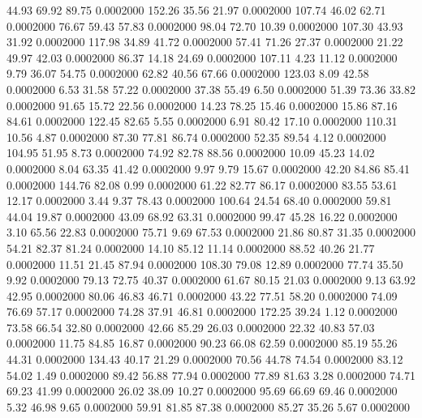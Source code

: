   44.93   69.92   89.75   0.0002000
 152.26   35.56   21.97   0.0002000
 107.74   46.02   62.71   0.0002000
  76.67   59.43   57.83   0.0002000
  98.04   72.70   10.39   0.0002000
 107.30   43.93   31.92   0.0002000
 117.98   34.89   41.72   0.0002000
  57.41   71.26   27.37   0.0002000
  21.22   49.97   42.03   0.0002000
  86.37   14.18   24.69   0.0002000
 107.11    4.23   11.12   0.0002000
   9.79   36.07   54.75   0.0002000
  62.82   40.56   67.66   0.0002000
 123.03    8.09   42.58   0.0002000
   6.53   31.58   57.22   0.0002000
  37.38   55.49    6.50   0.0002000
  51.39   73.36   33.82   0.0002000
  91.65   15.72   22.56   0.0002000
  14.23   78.25   15.46   0.0002000
  15.86   87.16   84.61   0.0002000
 122.45   82.65    5.55   0.0002000
   6.91   80.42   17.10   0.0002000
 110.31   10.56    4.87   0.0002000
  87.30   77.81   86.74   0.0002000
  52.35   89.54    4.12   0.0002000
 104.95   51.95    8.73   0.0002000
  74.92   82.78   88.56   0.0002000
  10.09   45.23   14.02   0.0002000
   8.04   63.35   41.42   0.0002000
   9.97    9.79   15.67   0.0002000
  42.20   84.86   85.41   0.0002000
 144.76   82.08    0.99   0.0002000
  61.22   82.77   86.17   0.0002000
  83.55   53.61   12.17   0.0002000
   3.44    9.37   78.43   0.0002000
 100.64   24.54   68.40   0.0002000
  59.81   44.04   19.87   0.0002000
  43.09   68.92   63.31   0.0002000
  99.47   45.28   16.22   0.0002000
   3.10   65.56   22.83   0.0002000
  75.71    9.69   67.53   0.0002000
  21.86   80.87   31.35   0.0002000
  54.21   82.37   81.24   0.0002000
  14.10   85.12   11.14   0.0002000
  88.52   40.26   21.77   0.0002000
  11.51   21.45   87.94   0.0002000
 108.30   79.08   12.89   0.0002000
  77.74   35.50    9.92   0.0002000
  79.13   72.75   40.37   0.0002000
  61.67   80.15   21.03   0.0002000
   9.13   63.92   42.95   0.0002000
  80.06   46.83   46.71   0.0002000
  43.22   77.51   58.20   0.0002000
  74.09   76.69   57.17   0.0002000
  74.28   37.91   46.81   0.0002000
 172.25   39.24    1.12   0.0002000
  73.58   66.54   32.80   0.0002000
  42.66   85.29   26.03   0.0002000
  22.32   40.83   57.03   0.0002000
  11.75   84.85   16.87   0.0002000
  90.23   66.08   62.59   0.0002000
  85.19   55.26   44.31   0.0002000
 134.43   40.17   21.29   0.0002000
  70.56   44.78   74.54   0.0002000
  83.12   54.02    1.49   0.0002000
  89.42   56.88   77.94   0.0002000
  77.89   81.63    3.28   0.0002000
  74.71   69.23   41.99   0.0002000
  26.02   38.09   10.27   0.0002000
  95.69   66.69   69.46   0.0002000
   5.32   46.98    9.65   0.0002000
  59.91   81.85   87.38   0.0002000
  85.27   35.26    5.67   0.0002000
